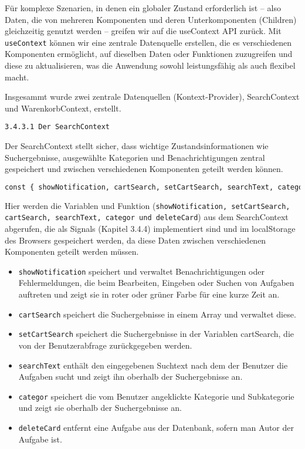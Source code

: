 Für komplexe Szenarien, in denen ein globaler Zustand erforderlich ist – also Daten, die von mehreren Komponenten und deren Unterkomponenten (Children) gleichzeitig genutzt werden – greifen wir auf die useContext API zurück. Mit \texttt{useContext} können wir eine zentrale Datenquelle erstellen, die es verschiedenen Komponenten ermöglicht, auf dieselben Daten oder Funktionen zuzugreifen und diese zu aktualisieren, was die Anwendung sowohl leistungsfähig als auch flexibel macht.

Insgesammt wurde zwei zentrale Datenquellen (Kontext-Provider), SearchContext und WarenkorbContext, erstellt. 

\texttt{3.4.3.1 Der SearchContext}

Der SearchContext stellt sicher, dass wichtige Zustandsinformationen wie Suchergebnisse, ausgewählte Kategorien und Benachrichtigungen zentral gespeichert und zwischen verschiedenen Komponenten geteilt werden können. 


\begin{lstlisting}[language=Python]
const { showNotification, cartSearch, setCartSearch, searchText, categor, deleteCard } = useContext(SearchContext);
 \end{lstlisting}  
 
Hier werden die Variablen und Funktion (\texttt{showNotification, setCartSearch, cartSearch, searchText, categor und deleteCard}) aus dem SearchContext abgerufen, die als Signals (Kapitel 3.4.4) implementiert sind und im localStorage des Browsers gespeichert werden, da diese Daten zwischen verschiedenen Komponenten geteilt werden müssen.

\begin{itemize}
  \item \texttt{showNotification} speichert und verwaltet Benachrichtigungen oder Fehlermeldungen, die beim Bearbeiten, Eingeben oder Suchen von Aufgaben auftreten und zeigt sie in roter oder grüner Farbe für eine kurze Zeit an.
  \item \texttt{cartSearch} speichert die Suchergebnisse in einem Array und verwaltet diese.
    \item \texttt{setCartSearch} speichert die Suchergebnisse in der Variablen cartSearch, die von der Benutzerabfrage zurückgegeben werden.
    \item \texttt{searchText} enthält den eingegebenen Suchtext nach dem der Benutzer die Aufgaben sucht und zeigt ihn oberhalb der Suchergebnisse an.
    \item \texttt{categor} speichert die vom Benutzer angeklickte Kategorie und Subkategorie und zeigt sie oberhalb der Suchergebnisse an.
    \item \texttt{deleteCard} entfernt eine Aufgabe aus der Datenbank, sofern man Autor der Aufgabe ist.
  
\end{itemize}


